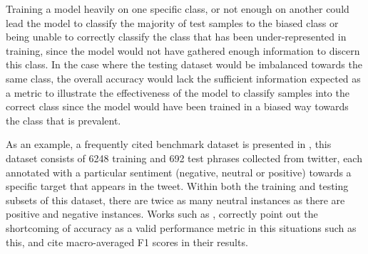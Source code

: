 \documentclass[../../fyp.tex]{subfiles}
\begin{document}
Training a model heavily on one specific class, or not enough on another could lead the model to classify the majority of test samples to the biased class or being unable to correctly classify the class that has been under-represented in training, since the model would not have gathered enough information to discern this class. In the case where the testing dataset would be imbalanced towards the same class, the overall accuracy would lack the sufficient information expected as a metric to illustrate the effectiveness of the model to classify samples into the correct class since the model would have been trained in a biased way towards the class that is prevalent.

As an example, a frequently cited benchmark dataset is presented in \cite{dong}, this dataset consists of 6248 training and 692 test phrases collected from twitter, each annotated with a particular sentiment (negative, neutral or positive) towards a specific target that appears in the tweet. Within both the training and testing subsets of this dataset, there are twice as many neutral instances as there are positive and negative instances. Works such as \cite{chen2017}, \cite{dong} correctly point out the shortcoming of accuracy as a valid performance metric in this situations such as this, and cite macro-averaged F1 scores in their results.
\end{document}
